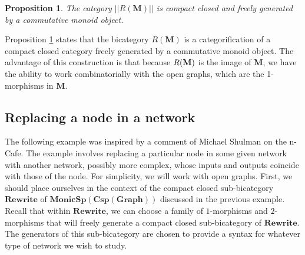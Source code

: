 \documentclass[11pt]{amsart}
\newcommand{\cat}[1]{\mathbf{#1}}
\newcommand{\bimonspcsp}[1]{\mathbf{MonicSp(Csp(#1))}}
\newtheorem{prop}[thm]{Proposition}
\theoremstyle{remark}
\theoremstyle{definition}
\begin{document}
\begin{prop}
	\label{thm:SyntaxMonoid}
	The category 
		$|| R ( \cat{ M } ) ||$ 
	is compact closed and 
	freely generated by a commutative monoid object.
\end{prop}

Proposition \ref{thm:SyntaxMonoid} states 
that the bicategory 
	$ R ( \cat{ M } ) $ 
is a categorification of a 
compact closed category freely generated by a commutative monoid object. 
The advantage of this construction is that
because $R(\bold{M})$ is the image of 
	$ \cat{ M } $, 
we have the ability to work 
combinatorially with the open graphs,
which are the 1-morphisms in $\cat{M}$.  


\subsection{Replacing a node in a network}

The following example was inspired 
by a comment of Michael Shulman \cite{Shul} 
on the n-Cafe.
The example involves replacing a particular node 
in some given network with another network, 
possibly more complex, 
whose inputs and outputs 
coincide with those of the node. 
For simplicity, we will work with open graphs.
First, we should place ourselves
in the context of the 
compact closed sub-bicategory
$\cat{Rewrite}$ of $\bimonspcsp{Graph}$
discussed in the previous example. 
Recall that within $\cat{Rewrite}$,
we can choose a family of $1$-morphisms 
and $2$-morphisms that will freely generate 
a compact closed sub-bicategory of $\cat{Rewrite}$.
The generators of this sub-bicategory
are chosen to provide a syntax
for whatever type of network we wish to study.
\end{document}
